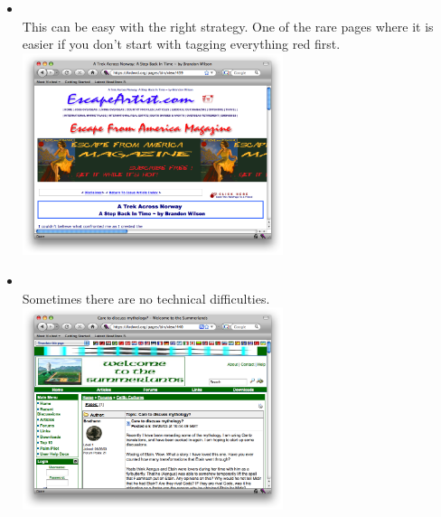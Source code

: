 \documentclass[12pt]{article}
\begin{document}
\begin{itemize}
\item {} \\
This can be easy with the right strategy. One of the rare pages where it is easier if you don't start with tagging everything red first. \\
\includegraphics[width=0.6\textwidth]{images/439.png} \\

\item {} \\
Sometimes there are no technical difficulties. \\
\includegraphics[width=0.6\textwidth]{images/440.png} \\

\end{itemize}
\end{document}
